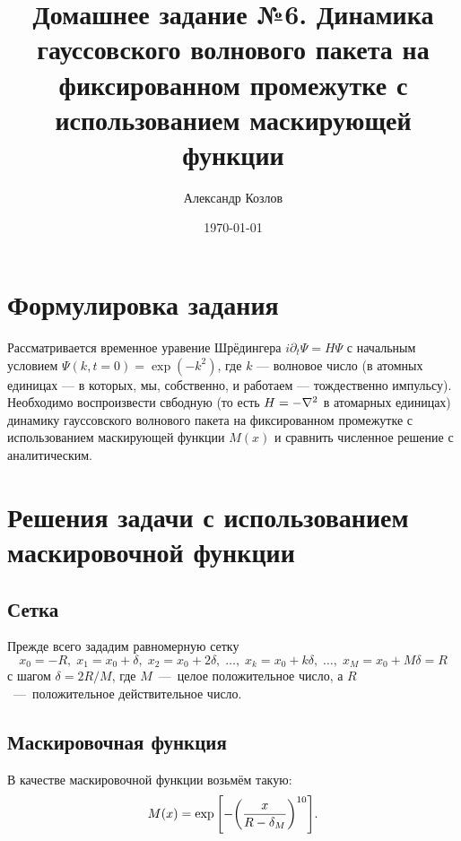 \documentclass[10pt]{article}
\title{Домашнее задание №6. Динамика гауссовского волнового пакета на фиксированном промежутке с использованием маскирующей функции}
\author{Александр Козлов}
\date{\today}
\begin{document}
\maketitle

\section*{Формулировка задания}

Рассматривается временное уравение Шрёдингера $i \partial_t \Psi = H \Psi$ с начальным условием $\Psi(k,t=0) = \exp(-k^2)$, где $k$ --- волновое число (в атомных единицах --- в которых, мы, собственно, и работаем --- тождественно импульсу). Необходимо воспроизвести свбодную (то есть $H=-\laplacian$ в атомарных единицах) динамику гауссовского волнового пакета на фиксированном промежутке с использованием маскирующей функции $M(x)$ и сравнить численное решение с аналитическим.

\section{Решения задачи с использованием маскировочной функции}

\subsection*{Сетка}
Прежде всего зададим равномерную сетку
\begin{equation}
	x_0 = -R,\; x_1 = x_0 + \delta,\; x_2 = x_0 + 2\delta,\; \ldots,\; x_k = x_0 + k\delta,\; \ldots,\; x_M = x_0 + M \delta = R
\end{equation}
с шагом $\delta = 2R/M$, где $M$~---~целое положительное число, а $R$~---~положительное действительное число.

\subsection*{Маскировочная функция}
В качестве маскировочной функции возьмём такую:
\begin{equation}
	M(x) = \exp\qty[-\qty(\dfrac{x}{R-\delta_M})^{10}].
\end{equation}
\end{document}
